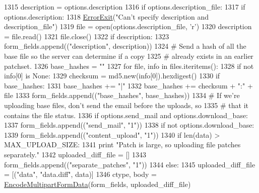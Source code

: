\begin{DoxyCode}
{{{{1315   description = options.description
1316   \textcolor{keywordflow}{if} options.description\_file:
1317     \textcolor{keywordflow}{if} options.description:
1318       \hyperlink{namespaceupload_adea53186a1d73e92cc839b7c35c2c044}{ErrorExit}(\textcolor{stringliteral}{"Can't specify description and description\_file"})
1319     file = open(options.description\_file, \textcolor{stringliteral}{'r')}
1320 \textcolor{stringliteral}{    description = file.read()}
1321 \textcolor{stringliteral}{    file.close()}
1322 \textcolor{stringliteral}{  }\textcolor{keywordflow}{if} description:
1323     form\_fields.append((\textcolor{stringliteral}{"description"}, description))
1324   \textcolor{comment}{# Send a hash of all the base file so the server can determine if a copy}
1325   \textcolor{comment}{# already exists in an earlier patchset.}
1326   base\_hashes = \textcolor{stringliteral}{""}
1327   \textcolor{keywordflow}{for} file, info \textcolor{keywordflow}{in} files.iteritems():
1328     \textcolor{keywordflow}{if} \textcolor{keywordflow}{not} info[0] \textcolor{keywordflow}{is} \textcolor{keywordtype}{None}:
1329       checksum = md5.new(info[0]).hexdigest()
1330       \textcolor{keywordflow}{if} base\_hashes:
1331         base\_hashes += \textcolor{stringliteral}{"|"}
1332       base\_hashes += checksum + \textcolor{stringliteral}{":"} + file
1333   form\_fields.append((\textcolor{stringliteral}{"base\_hashes"}, base\_hashes))
1334   \textcolor{comment}{# If we're uploading base files, don't send the email before the uploads, so}
1335   \textcolor{comment}{# that it contains the file status.}
1336   \textcolor{keywordflow}{if} options.send\_mail \textcolor{keywordflow}{and} options.download\_base:
1337     form\_fields.append((\textcolor{stringliteral}{"send\_mail"}, \textcolor{stringliteral}{"1"}))
1338   \textcolor{keywordflow}{if} \textcolor{keywordflow}{not} options.download\_base:
1339     form\_fields.append((\textcolor{stringliteral}{"content\_upload"}, \textcolor{stringliteral}{"1"}))
1340   \textcolor{keywordflow}{if} len(data) > MAX\_UPLOAD\_SIZE:
1341     \textcolor{keywordflow}{print} \textcolor{stringliteral}{"Patch is large, so uploading file patches separately."}
1342     uploaded\_diff\_file = []
1343     form\_fields.append((\textcolor{stringliteral}{"separate\_patches"}, \textcolor{stringliteral}{"1"}))
1344   \textcolor{keywordflow}{else}:
1345     uploaded\_diff\_file = [(\textcolor{stringliteral}{"data"}, \textcolor{stringliteral}{"data.diff"}, data)]
1346   ctype, body = \hyperlink{namespaceupload_ae12985a2c860c124c502dd2099b702eb}{EncodeMultipartFormData}(form\_fields, uploaded\_diff\_file)
}}}}
\end{DoxyCode}
